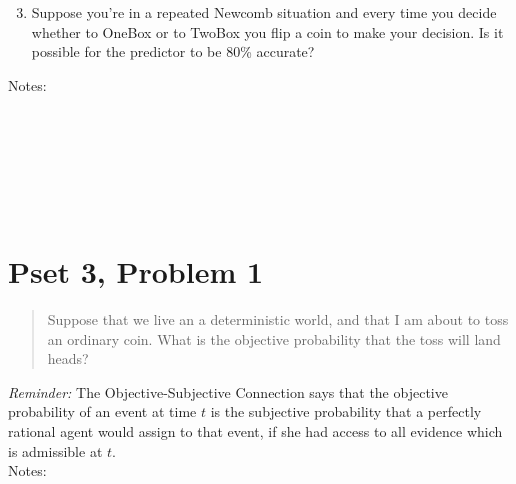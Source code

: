 \documentclass[justified]{tufte-handout}
\begin{document}
\begin{enumerate}
\setcounter{enumi}{2}
\item Suppose you're in a repeated Newcomb situation and every time you decide whether to OneBox or to TwoBox you flip a coin to make your decision. Is it possible for the predictor to be 80\% accurate?
\end{enumerate}

\noindent Notes:  \underline{\hspace{15.75cm}}\\\\\underline{\hspace{16.88cm}}\\\\\underline{\hspace{16.88cm}}\\\\\underline{\hspace{16.88cm}}\\

\section{Pset 3, Problem 1}

\begin{quote}
Suppose that we live an a deterministic world, and that I am about to toss an ordinary coin. What is the objective probability that the toss will land heads?
\end{quote}

\noindent\emph{Reminder:} The Objective-Subjective Connection says that the objective probability of an event at time $t$ is the subjective probability that a perfectly rational agent would assign to that event, if she had access to all evidence which is admissible at $t$.\\

\noindent Notes:  \underline{\hspace{15.75cm}}\\\\\underline{\hspace{16.88cm}}\\\\\underline{\hspace{16.88cm}}\\\\\underline{\hspace{16.88cm}}\\\\\underline{\hspace{16.88cm}}\\\\\underline{\hspace{16.88cm}}\\
\end{document}
